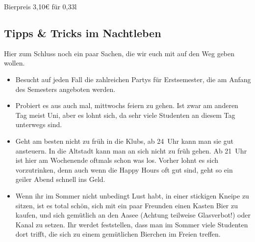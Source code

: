 {\begin{multicols*}{2}
Bierpreis 3,10€ für 0,33l

\begin{center}
\end{center}

\setcounter{secnumdepth}{\value{fibtemp}}
\subsection{Tipps \& Tricks im Nachtleben}
Hier zum Schluss noch ein paar Sachen, die wir euch mit auf den Weg geben wollen.
\begin{itemize}[labelsep=*, leftmargin=1.2em]
	\item Besucht auf jeden Fall die zahlreichen Partys für Erstsemester, die am Anfang des Semesters angeboten werden.
	\item Probiert es aus auch mal, mittwochs feiern zu gehen.
	Ist zwar am anderen Tag meist Uni, aber es lohnt sich, da sehr viele Studenten an diesem Tag unterwegs sind.
	\item Geht am besten nicht zu früh in die Klubs, ab 24~Uhr kann man sie gut ansteuern.
	In die Altstadt kann man an sich nicht zu früh gehen.
	Ab 21~Uhr ist hier am Wochenende oftmals schon was los.
	Vorher lohnt es sich vorzutrinken, denn auch wenn die Happy Hours oft gut sind, geht so ein geiler Abend schnell ins Geld.
	\item Wenn ihr im Sommer nicht unbedingt Lust habt, in einer stickigen Kneipe zu sitzen, ist es total schön, sich mit ein paar Freunden einen Kasten Bier zu kaufen, und sich gemütlich an den Aasee (Achtung teilweise Glasverbot!) oder Kanal zu setzen.
	Ihr werdet feststellen, dass man im Sommer viele Studenten dort trifft, die sich zu einem gemütlichen Bierchen im Freien treffen.
\end{itemize}

\end{multicols*}

}
